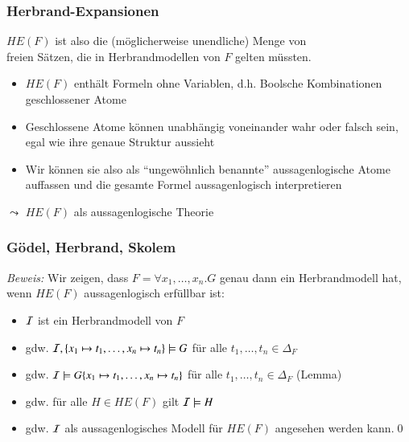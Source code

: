 \documentclass[aspectratio=1610,onlymath]{beamer}
\begin{document}
\begin{frame}\frametitle{Herbrand-Expansionen}


$HE(F)$ ist also die (möglicherweise unendliche) Menge von \\ freien Sätzen, die in Herbrandmodellen von $F$ gelten müssten.
\pause\bigskip

\begin{itemize}
\item $HE(F)$ enthält Formeln ohne Variablen, d.h. Boolsche Kombinationen geschlossener Atome
\item Geschlossene Atome können unabhängig voneinander wahr oder falsch sein, egal wie ihre genaue Struktur aussieht
\item Wir können sie also als "`ungewöhnlich benannte"' aussagenlogische Atome auffassen und die gesamte Formel aussagenlogisch interpretieren
\end{itemize}
\alert{$\leadsto$ $HE(F)$ als aussagenlogische Theorie}


\end{frame}

\begin{frame}\frametitle{Gödel, Herbrand, Skolem}

\pause

\emph{Beweis:} Wir zeigen, dass $F=\forall x_1,\ldots,x_n.G$ genau dann ein Herbrandmodell hat, wenn $HE(F)$ aussagenlogisch erfüllbar ist:\pause

\begin{itemize}
\item $\mathcal{I}$ ist ein Herbrandmodell von $F$\pause
\item gdw. $\mathcal{I},\{x_1\mapsto t_1,\ldots,x_n\mapsto t_n\}\models G$ für alle $t_1,\ldots,t_n\in\Delta_F$\pause
\item gdw. $\mathcal{I}\models G\{x_1\mapsto t_1,\ldots,x_n\mapsto t_n\}$ für alle $t_1,\ldots,t_n\in\Delta_F$ (Lemma)\pause
\item gdw. für alle $H\in HE(F)$ gilt $\mathcal{I}\models H$\pause
\item gdw. $\mathcal{I}$ als aussagenlogisches Modell für $HE(F)$ angesehen werden kann.\qed
\end{itemize}

\end{frame}
\end{document}
